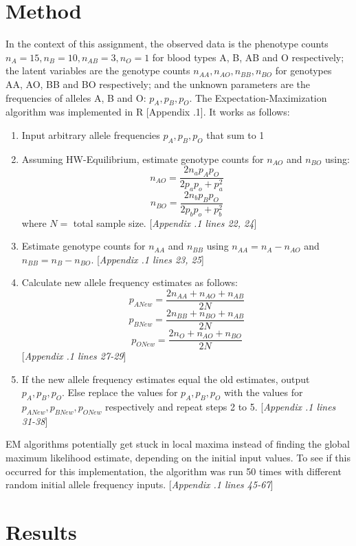 \documentclass{article}
\begin{document}
	\section{Method}
	
	In the context of this assignment, the observed data is the phenotype counts $n_A = 15, n_B = 10, n_{AB} = 3, n_O = 1$ for blood types A, B, AB and O respectively; the latent variables are the genotype counts $n_{AA}, n_{AO}, n_{BB}, n_{BO}$ for genotypes AA, AO, BB and BO respectively; and the unknown parameters are the frequencies of alleles A, B and O: $p_A, p_B, p_O$. The Expectation-Maximization algorithm was implemented in R [Appendix .1]. It works as follows:
	
	\begin{enumerate}
		\item Input arbitrary allele frequencies $p_A, p_B, p_O$ that sum to 1
		\item Assuming HW-Equilibrium, estimate genotype counts for $n_{AO}$ and $n_{BO}$ using:
		 \[n_{AO} = \frac{2n_ap_Ap_O}{2p_ap_o + p_a^2} \] 
		 \[n_{BO} = \frac{2n_bp_Bp_O}{2p_bp_o + p_b^2}\] 
		 where $N =$ total sample size. [\emph{Appendix .1 lines 22, 24}]
		\item Estimate genotype counts for $n_{AA}$ and $n_{BB}$ using $n_{AA} = n_{A} - n_{AO}$ and $n_{BB} = n_{B} - n_{BO}$. [\emph{Appendix .1 lines 23, 25}]
		\item Calculate new allele frequency estimates as follows:
		\[p_{ANew} = \frac{2n_{AA} + n_{AO} + n_{AB}}{2N}\]
		\[p_{BNew} = \frac{2n_{BB} + n_{BO} + n_{AB}}{2N}\]		
		\[p_{ONew} = \frac{2n_{O} + n_{AO} + n_{BO}}{2N}\]	
		[\emph{Appendix .1 lines 27-29}]
		\item If the new allele frequency estimates equal the old estimates, output $p_A, p_B, p_O$. Else replace the values for $p_A, p_B, p_O$ with the values for $p_{ANew}, p_{BNew}, p_{ONew}$ respectively and repeat steps 2 to 5. [\emph{Appendix .1 lines 31-38}]
		
	\end{enumerate}

	EM algorithms potentially get stuck in local maxima instead of finding the global maximum likelihood estimate, depending on the initial input values. To see if this occurred for this implementation, the algorithm was run 50 times with different random initial allele frequency inputs. [\emph{Appendix .1 lines 45-67}]
	 
	\section{Results}
	
\end{document}
